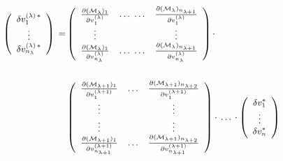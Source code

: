 \begin{equation}
\small
\begin{split}
\left(
\begin{array}{c}
\delta v^{(\lambda) \, \ast}_1 \\
\vdots \\
\delta v^{(\lambda) \, \ast}_{n_{\lambda}} \\
\end{array}
\right)
\, = &
\left(
\begin{array}{ccc}
\frac{\partial ({\cal M}_{\lambda})_1}{\partial v^{(\lambda)}_1}
& \ldots \,\, \ldots &
\frac{\partial ({\cal M}_{\lambda})_{n_{\lambda+1}}}{\partial v^{(\lambda)}_1} \\
\vdots & ~ & \vdots \\
\frac{\partial ({\cal M}_{\lambda})_1}{\partial v^{(\lambda)}_{n_{\lambda}}}
& \ldots \,\, \ldots  &
\frac{\partial ({\cal M}_{\lambda})_{n_{\lambda+1}}}{\partial v^{(\lambda)}_{n_{\lambda}}} \\
\end{array}
\right)
\cdot
%
\\ ~ & ~
\\ ~ &
%
\left(
\begin{array}{ccc}
\frac{\partial ({\cal M}_{\lambda+1})_1}{\partial v^{(\lambda+1)}_1}
& \ldots &
\frac{\partial ({\cal M}_{\lambda+1})_{n_{\lambda+2}}}{\partial v^{(\lambda+1)}_1} \\
\vdots & ~ & \vdots \\
\vdots & ~ & \vdots \\
\frac{\partial ({\cal M}_{\lambda+1})_1}{\partial v^{(\lambda+1)}_{n_{\lambda+1}}}
& \ldots  &
\frac{\partial ({\cal M}_{\lambda+1})_{n_{\lambda+2}}}{\partial v^{(\lambda+1)}_{n_{\lambda+1}}} \\
\end{array}
\right)
\cdot \, \ldots \, \cdot
\left(
\begin{array}{c}
\delta v^{\ast}_1 \\
\vdots \\
\delta v^{\ast}_{n} \\
\end{array}
\right)
\end{split}
\end{equation}

